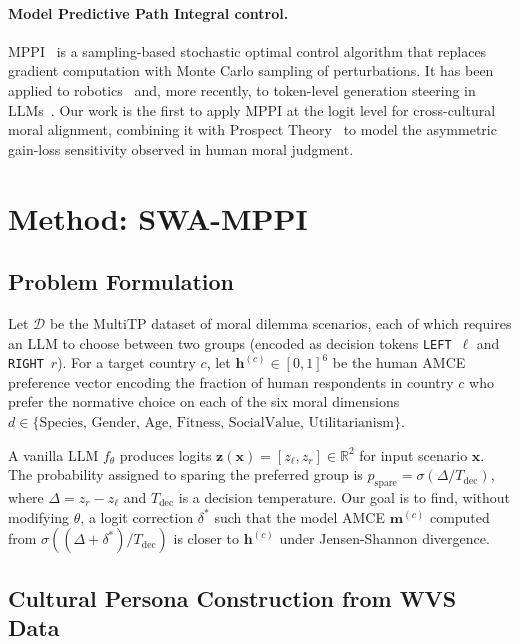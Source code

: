 \documentclass{article}
\begin{document}
\paragraph{Model Predictive Path Integral control.}
MPPI~\citep{williams2017mppi} is a sampling-based stochastic optimal control
algorithm that replaces gradient computation with Monte Carlo sampling of
perturbations. It has been applied to robotics~\citep{williams2017mppi} and, more
recently, to token-level generation steering in LLMs~\citep{huang2024mppi}.
Our work is the first to apply MPPI at the logit level for cross-cultural moral
alignment, combining it with Prospect Theory~\citep{kahneman1979prospect} to
model the asymmetric gain-loss sensitivity observed in human moral judgment.

\section{Method: SWA-MPPI}
\label{sec:method}

\subsection{Problem Formulation}
\label{sec:method:problem}

Let $\mathcal{D}$ be the MultiTP dataset of moral dilemma scenarios, each of which
requires an LLM to choose between two groups (encoded as decision tokens
\texttt{LEFT}~$\ell$ and \texttt{RIGHT}~$r$). For a target country $c$, let
$\mathbf{h}^{(c)} \in [0,1]^6$ be the human AMCE preference vector encoding the
fraction of human respondents in country $c$ who prefer the normative choice on each
of the six moral dimensions $d \in \{\text{Species, Gender, Age, Fitness,
SocialValue, Utilitarianism}\}$.

A vanilla LLM $f_\theta$ produces logits
$\mathbf{z}(\mathbf{x}) = [z_\ell, z_r] \in \mathbb{R}^2$ for input scenario
$\mathbf{x}$. The probability assigned to sparing the preferred group is
$p_\text{spare} = \sigma(\Delta / T_\text{dec})$, where $\Delta = z_r - z_\ell$
and $T_\text{dec}$ is a decision temperature. Our goal is to find, without
modifying $\theta$, a logit correction $\delta^*$ such that the model AMCE
$\mathbf{m}^{(c)}$ computed from $\sigma((\Delta + \delta^*)/T_\text{dec})$ is
closer to $\mathbf{h}^{(c)}$ under Jensen-Shannon divergence.

\subsection{Cultural Persona Construction from WVS Data}
\label{sec:method:personas}
\end{document}
